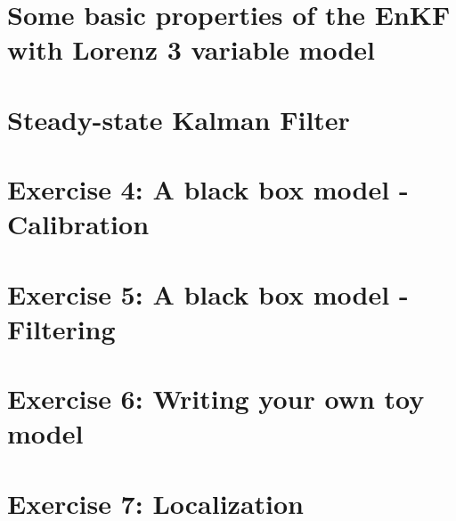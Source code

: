 \documentclass[a4paper,10pt]{article}
\begin{document}
\section{Some basic properties of the EnKF with Lorenz 3 variable model}


\section{Steady-state Kalman Filter}


\section{Exercise 4: A black box model - Calibration}
\newcommand{\opgave}{exercise\_4}



\section{Exercise 5: A black box model - Filtering}


\section{Exercise 6: Writing your own toy model}


\section{Exercise 7: Localization}

\end{document}
